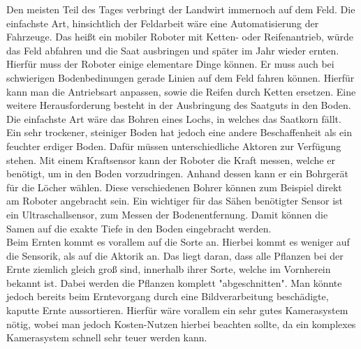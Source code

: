 Den meisten Teil des Tages verbringt der Landwirt immernoch auf dem Feld. Die
einfachste Art, hinsichtlich der Feldarbeit wäre eine Automatisierung der
Fahrzeuge. Das heißt ein mobiler Roboter mit Ketten- oder Reifenantrieb, würde
das Feld abfahren und die Saat ausbringen und später im Jahr wieder ernten. \\
Hierfür muss der Roboter einige elementare Dinge können. Er muss auch bei
schwierigen Bodenbedinungen gerade Linien auf dem Feld fahren können. Hierfür
kann man die Antriebsart anpassen, sowie die Reifen durch Ketten ersetzen. Eine
weitere Herausforderung besteht in der Ausbringung des Saatguts in den Boden.
Die einfachste Art wäre das Bohren eines Lochs, in welches das Saatkorn fällt.
Ein sehr trockener, steiniger Boden hat jedoch eine andere Beschaffenheit als
ein feuchter erdiger Boden. Dafür müssen unterschiedliche Aktoren zur Verfügung
stehen. Mit einem Kraftsensor kann der Roboter die Kraft messen, welche er
benötigt, um in den Boden vorzudringen. Anhand dessen kann er ein Bohrgerät für
die Löcher wählen. Diese verschiedenen Bohrer können zum Beispiel direkt am
Roboter angebracht sein.\cite{naik2016precision} Ein wichtiger für das Sähen benötigter Sensor ist ein
Ultraschallsensor, zum Messen der Bodenentfernung. Damit können die Samen auf
die exakte Tiefe in den Boden eingebracht werden.\\ Beim Ernten kommt es
vorallem auf die Sorte an. Hierbei kommt es weniger auf die Sensorik, als auf
die Aktorik an. Das liegt daran, dass alle Pflanzen bei der Ernte ziemlich
gleich groß sind, innerhalb ihrer Sorte, welche im Vornherein bekannt ist.
Dabei werden die Pflanzen komplett "abgeschnitten". Man könnte jedoch bereits
beim Erntevorgang durch eine Bildverarbeitung beschädigte, kaputte Ernte
aussortieren. Hierfür wäre vorallem ein sehr gutes Kamerasystem nötig, wobei
man jedoch Kosten-Nutzen hierbei beachten sollte, da ein komplexes Kamerasystem
schnell sehr teuer werden kann.